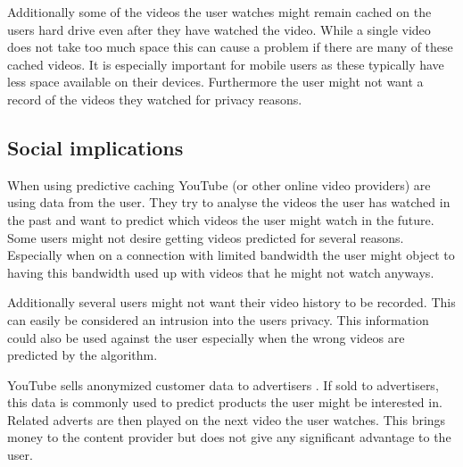 Additionally some of the videos the user watches might remain cached on the users hard drive even after they have watched the video. While a single video does not take too much space this can cause a problem if there are many of these cached videos. It is especially important for mobile users as these typically have less space available on their devices. Furthermore the user might not want a record of the videos they watched for privacy reasons. 

\subsection{Social implications}
When using predictive caching YouTube (or other online video providers) are using data from the user. They try to analyse the videos the user has watched in the past and want to predict which videos the user might watch in the future. Some users might not desire getting videos predicted for several reasons. Especially when on a connection with limited bandwidth the user might object to having this bandwidth used up with videos that he might not watch anyways. 

Additionally several users might not want their video history to be recorded. This can easily be considered an intrusion into the users privacy. This information could also be used against the user  especially when the wrong videos are predicted by the algorithm. 

YouTube sells anonymized customer data to advertisers . If sold to advertisers, this data is commonly used to predict products the user might be interested in. Related adverts are then played on the next video the user watches. This brings money to the content provider but does not give any significant advantage to the user. 
